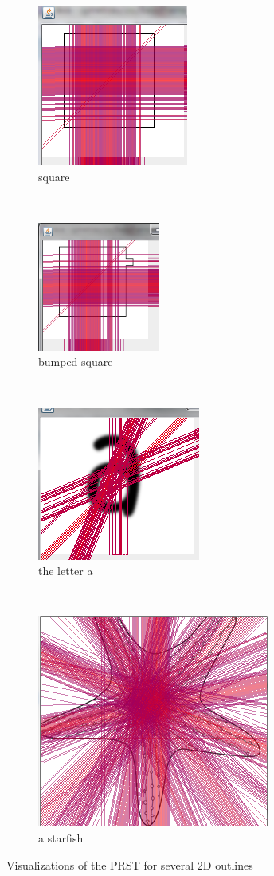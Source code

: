 \documentclass[10pt,a4paper]{article}			%
\begin{document}
\begin{figure}[h]
        \centering
        \begin{subfigure}{120 pt}
                \includegraphics[height=120 pt]{img/carre2_5000.png}
                \caption{square}
                \label{square}
        \end{subfigure}
        ~
        \begin{subfigure}{120 pt}
                \includegraphics[height = 120pt]{img/carre3_5000_bis.png}
                \caption{bumped square}
                \label{bump_square}
        \end{subfigure}
       
       ~\\
	\begin{subfigure}{120 pt}
	 \includegraphics[height=120 pt]{img/sample_1000_seuil_07.png}
	 \caption{the letter a}
                \label{a}
                   \end{subfigure}
	~
	\begin{subfigure}{120 pt}
	 \includegraphics[height=120 pt]{img/n_32_sample2000_seuil06.png}
	 \caption{a starfish}
                \label{star}
              \end{subfigure}     
                \caption{Visualizations of the PRST for several 2D outlines}
	\label{visualization}
\end{figure}
\end{document}
